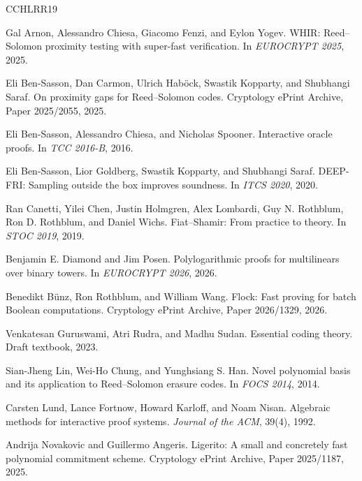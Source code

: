 \documentclass[11pt]{article}
\theoremstyle{plain}
\theoremstyle{definition}
\theoremstyle{remark}
\begin{document}
\begin{thebibliography}{CCHLRR19}

 Gal Arnon, Alessandro Chiesa, Giacomo Fenzi, and Eylon Yogev. WHIR: Reed--Solomon proximity testing with super-fast verification. In \emph{EUROCRYPT 2025}, 2025.

 Eli Ben-Sasson, Dan Carmon, Ulrich Hab\"ock, Swastik Kopparty, and Shubhangi Saraf. On proximity gaps for Reed--Solomon codes. Cryptology ePrint Archive, Paper 2025/2055, 2025.

 Eli Ben-Sasson, Alessandro Chiesa, and Nicholas Spooner. Interactive oracle proofs. In \emph{TCC 2016-B}, 2016.

 Eli Ben-Sasson, Lior Goldberg, Swastik Kopparty, and Shubhangi Saraf. DEEP-FRI: Sampling outside the box improves soundness. In \emph{ITCS 2020}, 2020.

 Ran Canetti, Yilei Chen, Justin Holmgren, Alex Lombardi, Guy N. Rothblum, Ron D. Rothblum, and Daniel Wichs. Fiat--Shamir: From practice to theory. In \emph{STOC 2019}, 2019.

 Benjamin E. Diamond and Jim Posen. Polylogarithmic proofs for multilinears over binary towers. In \emph{EUROCRYPT 2026}, 2026.

 Benedikt B\"unz, Ron Rothblum, and William Wang. Flock: Fast proving for batch Boolean computations. Cryptology ePrint Archive, Paper 2026/1329, 2026.

 Venkatesan Guruswami, Atri Rudra, and Madhu Sudan. Essential coding theory. Draft textbook, 2023.

 Sian-Jheng Lin, Wei-Ho Chung, and Yunghsiang S. Han. Novel polynomial basis and its application to Reed--Solomon erasure codes. In \emph{FOCS 2014}, 2014.

 Carsten Lund, Lance Fortnow, Howard Karloff, and Noam Nisan. Algebraic methods for interactive proof systems. \emph{Journal of the ACM}, 39(4), 1992.

 Andrija Novakovic and Guillermo Angeris. Ligerito: A small and concretely fast polynomial commitment scheme. Cryptology ePrint Archive, Paper 2025/1187, 2025.

\end{thebibliography}
\end{document}
